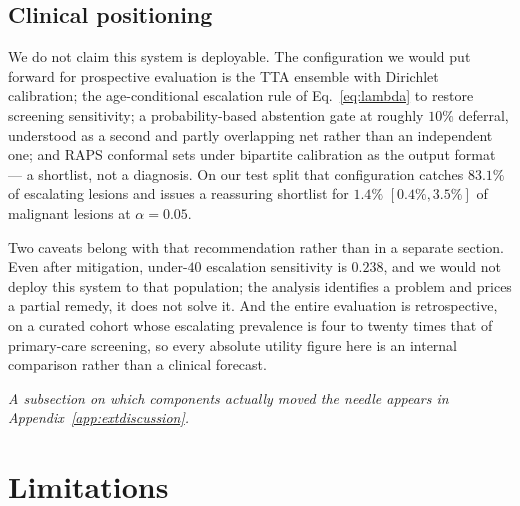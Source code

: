 \documentclass[journal]{IEEEtran}
\begin{document}
\subsection{Clinical positioning}
We do not claim this system is deployable. The configuration we would put forward for
prospective evaluation is the TTA ensemble with Dirichlet calibration; the age-conditional
escalation rule of Eq.~\eqref{eq:lambda} to restore screening sensitivity; a probability-based
abstention gate at roughly $10\%$ deferral, understood as a second and partly overlapping net
rather than an independent one; and RAPS conformal sets under bipartite calibration as the
output format --- a shortlist, not a diagnosis. On our test split that configuration catches
$83.1\%$ of escalating lesions and issues a reassuring shortlist for $1.4\%$ $[0.4\%, 3.5\%]$
of malignant lesions at $\alpha=0.05$.

Two caveats belong with that recommendation rather than in a separate section. Even after
mitigation, under-$40$ escalation sensitivity is $0.238$, and we would not deploy this system
to that population; the analysis identifies a problem and prices a partial remedy, it does not
solve it. And the entire evaluation is retrospective, on a curated cohort whose escalating
prevalence is four to twenty times that of primary-care screening, so every absolute utility
figure here is an internal comparison rather than a clinical forecast.


\textit{A subsection on which components actually moved the needle appears in Appendix~\ref{app:extdiscussion}.}
\section{Limitations}
\label{sec:limitations}
\end{document}
